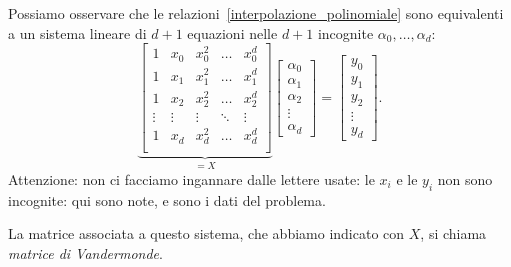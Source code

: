 \documentclass[a4paper]{report}
\theoremstyle{definition}
\theoremstyle{remark}
\begin{document}
Possiamo osservare che le relazioni~\eqref{interpolazione_polinomiale} sono equivalenti a un sistema lineare di $d+1$ equazioni nelle $d+1$ incognite $\alpha_0,\dots,\alpha_d$:
\[
\underbrace{
\begin{bmatrix}
    1 & x_0 & x_0^2 & \dots & x_0^{d}\\
    1 & x_1 & x_1^2 & \dots & x_1^{d}\\
    1 & x_2 & x_2^2 & \dots & x_2^{d}\\
    \vdots & \vdots & \vdots & \ddots & \vdots\\
    1 & x_d & x_d^2 & \dots & x_d^{d}\\
\end{bmatrix}
}_{=X}
\begin{bmatrix}
    \alpha_0 \\ \alpha_1 \\ \alpha_2 \\ \vdots \\ \alpha_d
\end{bmatrix}=
\begin{bmatrix}
    y_0 \\ y_1 \\ y_2 \\ \vdots \\ y_d
\end{bmatrix}.
\]
Attenzione: non ci facciamo ingannare dalle lettere usate: le $x_i$ e le $y_i$ non sono incognite: qui sono note, e sono i dati del problema.

La matrice associata a questo sistema, che abbiamo indicato con $X$, si chiama \emph{matrice di Vandermonde}.
\end{document}
